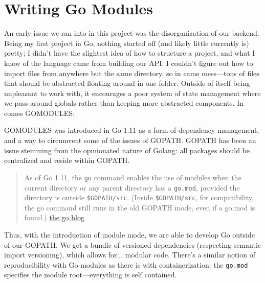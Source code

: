 \documentclass[11pt, twoside, reqno]{book}
\begin{document}
\section{Writing Go Modules}

An early issue we ran into in this project was the disorganization of our backend. Being my first project in Go, nothing started off (and likely little currently is) pretty; I didn't have the slightest idea of how to structure a project, and what I know of the language came from building our API. I couldn't figure out how to import files from anywhere but the same directory, so in came mess—tons of files that should be abstracted floating around in one folder. Outside of itself being unpleasant to work with, it encourages a poor system of state management where we pass around globals rather than keeping more abstracted components. In comes GOMODULES:

GOMODULES was introduced in Go 1.11 as a form of dependency management, and a way to circumvent some of the issues of GOPATH. GOPATH has been an issue stemming from the opinionated nature of Golang: all packages should be centralized and reside within GOPATH.

\begin{quote}
As of Go 1.11, the \texttt{go} command enables the use of modules when the current directory or any parent directory has a \texttt{go.mod}, provided the directory is outside \texttt{\$GOPATH/src}. (Inside \texttt{\$GOPATH/src}, for compatibility, the go command still runs in the old GOPATH mode, even if a go.mod is found.) \href{(https://blog.golang.org/using-go-modules}{the go blog}
\end{quote}

Thus, with the introduction of module mode, we are able to develop Go outside of our GOPATH. We get a bundle of versioned dependencies (respecting semantic import versioning), which allows for... modular code. There's a similar notion of reproducibility with Go modules as there is with containerization: the \texttt{go.mod} specifies the module root—everything is self contained.
\end{document}
